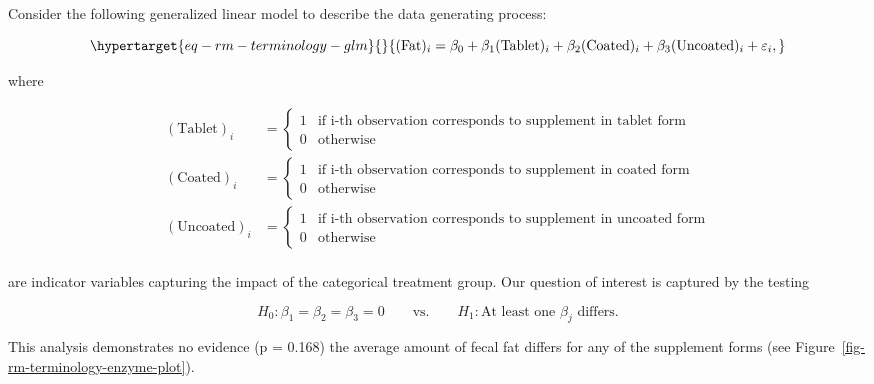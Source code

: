 \documentclass[
  letterpaper,
  DIV=11,
  numbers=noendperiod]{scrreprt}
\theoremstyle{definition}
\theoremstyle{definition}
\theoremstyle{remark}
\begin{document}
Consider the following generalized linear model to describe the data
generating process:

\begin{equation}\protect\hypertarget{eq-rm-terminology-glm}{}{(\text{Fat})_i = \beta_0 + \beta_1 (\text{Tablet})_i + \beta_2 (\text{Coated})_i + \beta_3 (\text{Uncoated})_i + \varepsilon_i,}\label{eq-rm-terminology-glm}\end{equation}

where

\[
\begin{aligned}
  (\text{Tablet})_i 
    &= \begin{cases}
      1 & \text{if i-th observation corresponds to supplement in tablet form} \\
      0 & \text{otherwise} \end{cases} \\
  (\text{Coated})_i
    &= \begin{cases}
      1 & \text{if i-th observation corresponds to supplement in coated form} \\
      0 & \text{otherwise} \end{cases} \\
  (\text{Uncoated})_i
    &= \begin{cases}
      1 & \text{if i-th observation corresponds to supplement in uncoated form} \\
      0 & \text{otherwise} \end{cases} \\
\end{aligned}
\]

are indicator variables capturing the impact of the categorical
treatment group. Our question of interest is captured by the testing

\[H_0: \beta_1 = \beta_2 = \beta_3 = 0 \qquad \text{vs.} \qquad H_1: \text{At least one } \beta_j \text{ differs}.\]

This analysis demonstrates no evidence (p = 0.168) the average amount of
fecal fat differs for any of the supplement forms (see
Figure~\ref{fig-rm-terminology-enzyme-plot}).
\end{document}
